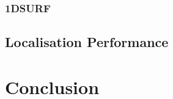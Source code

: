 \documentclass{article}
\begin{document}
\subsubsection{1DSURF}
\label{sec:1dsurfResults}


\subsection{Localisation Performance}
\label{sec:localisationPerformance}







\section{Conclusion}
\label{sec:conclusion}



%
%
 
\end{document}
